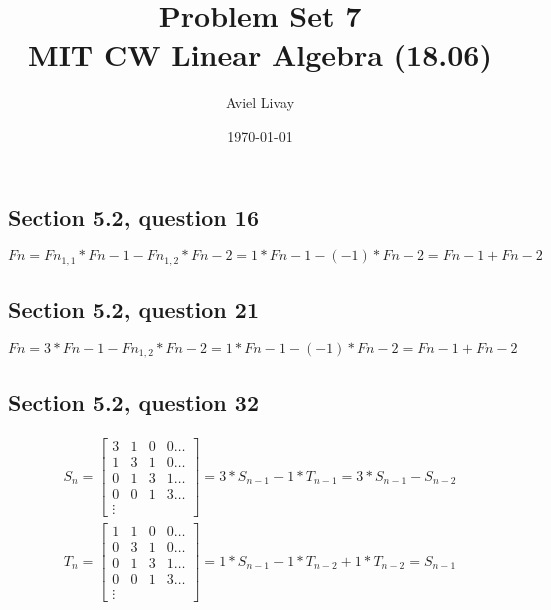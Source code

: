\documentclass[a4paper,11pt]{article}
\title{%
	Problem Set 7\\
	\large MIT CW Linear Algebra (18.06)
}
\author{Aviel Livay}
\date{\today}
\begin{document}
\maketitle

\subsection*{Section 5.2, question 16}
$Fn=F{n}_{1,1}*F{n-1}-F{n}_{1,2}*F{n-2}=1*F{n-1}-(-1)*F{n-2}=F{n-1}+F{n-2}$
\subsection*{Section 5.2, question 21}
$Fn=3*F{n-1}-F{n}_{1,2}*F{n-2}=1*F{n-1}-(-1)*F{n-2}=F{n-1}+F{n-2}$
\subsection*{Section 5.2, question 32}
\begin{align*}
S_n=
\begin{bmatrix}
3 & 1 & 0 & 0 \hdots \\
1 & 3 & 1 & 0 \hdots \\
0 & 1 & 3 & 1 \hdots \\
0 & 0 & 1 & 3 \hdots \\
\vdots
\end{bmatrix} 
=
3*S_{n-1}-1*T_{n-1}=3*S_{n-1}-S_{n-2}
\end{align*}
\begin{align*}
T_n=
\begin{bmatrix}
1 & 1 & 0 & 0\hdots \\
0 & 3 & 1 & 0\hdots \\
0 & 1 & 3 & 1\hdots \\
0 & 0 & 1 & 3\hdots \\
\vdots
\end{bmatrix} 
=
1*S_{n-1}-1*T_{n-2}+1*T_{n-2} = S_{n-1}
\end{align*}
\end{document}
